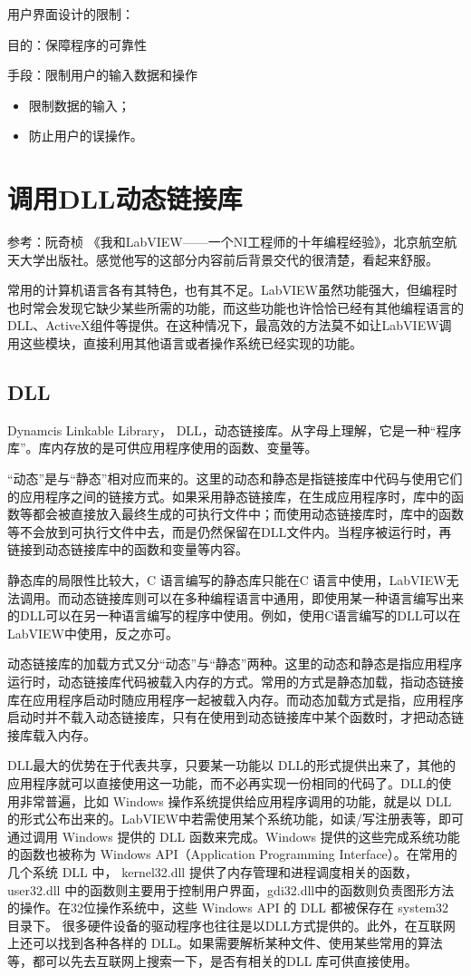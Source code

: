 用户界面设计的限制：

目的：保障程序的可靠性

手段：限制用户的输入数据和操作
\begin{itemize}
\item 限制数据的输入；
\item 防止用户的误操作。
\end{itemize}



\section{调用DLL动态链接库}
参考：阮奇桢 《我和LabVIEW——一个NI工程师的十年编程经验》，北京航空航天大学出版社。感觉他写的这部分内容前后背景交代的很清楚，看起来舒服。

常用的计算机语言各有其特色，也有其不足。LabVIEW虽然功能强大，但编程时也时常会发现它缺少某些所需的功能，而这些功能也许恰恰已经有其他编程语言的DLL、ActiveX组件等提供。在这种情况下，最高效的方法莫不如让LabVIEW调用这些模块，直接利用其他语言或者操作系统已经实现的功能。


\subsection{DLL}
Dynamcis Linkable Library， DLL，动态链接库。从字母上理解，它是一种“程序库”。库内存放的是可供应用程序使用的函数、变量等。

“动态”是与“静态”相对应而来的。这里的动态和静态是指链接库中代码与使用它们的应用程序之间的链接方式。如果采用静态链接库，在生成应用程序时，库中的函数等都会被直接放入最终生成的可执行文件中；而使用动态链接库时，库中的函数等不会放到可执行文件中去，而是仍然保留在DLL文件内。当程序被运行时，再链接到动态链接库中的函数和变量等内容。

静态库的局限性比较大，C 语言编写的静态库只能在C 语言中使用，LabVIEW无法调用。而动态链接库则可以在多种编程语言中通用，即使用某一种语言编写出来的DLL可以在另一种语言编写的程序中使用。例如，使用C语言编写的DLL可以在LabVIEW中使用，反之亦可。

动态链接库的加载方式又分“动态”与“静态”两种。这里的动态和静态是指应用程序运行时，动态链接库代码被载入内存的方式。常用的方式是静态加载，指动态链接库在应用程序启动时随应用程序一起被载入内存。而动态加载方式是指，应用程序启动时并不载入动态链接库，只有在使用到动态链接库中某个函数时，才把动态链接库载入内存。

DLL最大的优势在于代表共享，只要某一功能以 DLL的形式提供出来了，其他的应用程序就可以直接使用这一功能，而不必再实现一份相同的代码了。DLL的使用非常普遍，比如 Windows 操作系统提供给应用程序调用的功能，就是以 DLL 的形式公布出来的。LabVIEW中若需使用某个系统功能，如读/写注册表等，即可通过调用 Windows 提供的 DLL 函数来完成。Windows 提供的这些完成系统功能的函数也被称为 Windows API（Application Programming Interface）。在常用的几个系统 DLL 中， kernel32.dll 提供了内存管理和进程调度相关的函数，user32.dll 中的函数则主要用于控制用户界面，gdi32.dll中的函数则负责图形方法的操作。在32位操作系统中，这些 Windows API 的 DLL 都被保存在 system32 目录下。
%
很多硬件设备的驱动程序也往往是以DLL方式提供的。此外，在互联网上还可以找到各种各样的 DLL。如果需要解析某种文件、使用某些常用的算法等，都可以先去互联网上搜索一下，是否有相关的DLL 库可供直接使用。

